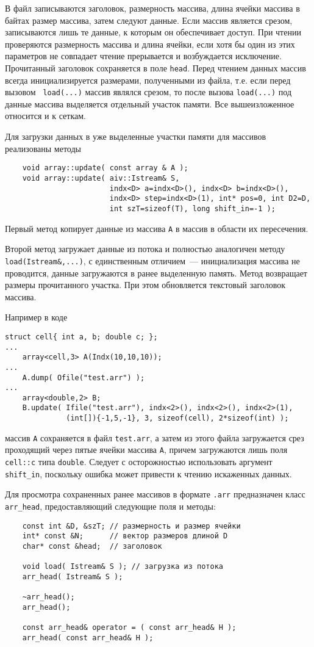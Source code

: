 В файл записываются заголовок, размерность массива, длина ячейки
массива в байтах размер массива, затем следуют данные. Если массив является
срезом, записываются лишь те данные, к которым он обеспечивает доступ. 
При чтении проверяются размерность массива и длина ячейки, если хотя бы один
из этих параметров не совпадает чтение прерывается и возбуждается исключение.
Прочитанный заголовок сохраняется в
поле {\tt head}. Перед чтением данных массив всегда
инициализируется размерами, полученными из файла, т.е. если перед вызовом {\tt
load(...)} массив являлся срезом, то после вызова {\tt load(...)} под данные массива
выделяется отдельный участок памяти. Все вышеизложенное относится и к сеткам.

Для загрузки данных в уже выделенные участки памяти для массивов реализованы
методы 
\begin{verbatim}
    void array::update( const array & A );
    void array::update( aiv::Istream& S, 
                        indx<D> a=indx<D>(), indx<D> b=indx<D>(), 
                        indx<D> step=indx<D>(1), int* pos=0, int D2=D, 
                        int szT=sizeof(T), long shift_in=-1 );
\end{verbatim}
Первый метод копирует данные из массива {\tt A} в массив в области их пересечения.

Второй метод загружает данные из потока и полностью аналогичен методу {\tt
  load(Istream\&,...)}, с единственным отличием~--- инициализация массива не
проводится, данные загружаются в ранее выделенную память. Метод возвращает
размеры прочитанного участка. 
При этом обновляется текстовый заголовок массива.

Например в коде
\begin{verbatim}
struct cell{ int a, b; double c; };
...
    array<cell,3> A(Indx(10,10,10));
...
    A.dump( Ofile("test.arr") );
...
    array<double,2> B; 
    B.update( Ifile("test.arr"), indx<2>(), indx<2>(), indx<2>(1),
              (int[]){-1,5,-1}, 3, sizeof(cell), 2*sizeof(int) );
\end{verbatim}
массив {\tt A} сохраняется в файл {\tt test.arr}, а затем из этого файла
загружается срез проходящий через пятые ячейки массива {\tt A}, причем
загружаются лишь поля {\tt cell::c} типа {\tt double}. Следует с осторожностью
использовать аргумент {\tt shift\_in}, поскольку ошибка может привести к
чтению искаженных данных.

Для просмотра сохраненных ранее массивов в формате {\tt .arr} предназначен
класс \verb'arr_head', предоставляющий следующие поля и методы:
\begin{verbatim}
    const int &D, &szT; // размерность и размер ячейки
    int* const &N;      // вектор размеров длиной D
    char* const &head;  // заголовок 

    void load( Istream& S ); // загрузка из потока
    arr_head( Istream& S );

    ~arr_head();
    arr_head();

    const arr_head& operator = ( const arr_head& H );
    arr_head( const arr_head& H );
\end{verbatim}

